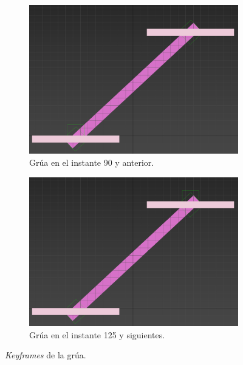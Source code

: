 \begin{figure}[H]
    \centering
\begin{subfigure}[t]{0.48\textwidth}
    \centering
    \includegraphics[width=\textwidth]{imagenes/grua/keyframes/90.png}
    \caption{Grúa en el instante 90 y anterior.}
 \end{subfigure}
\hfill
 \begin{subfigure}[t]{0.48\textwidth}
    \centering
    \includegraphics[width=\textwidth]{imagenes/grua/keyframes/125.png}
    \caption{Grúa en el instante 125 y siguientes.}
 \end{subfigure}
 \caption{\textit{Keyframes} de la grúa.}
\end{figure}